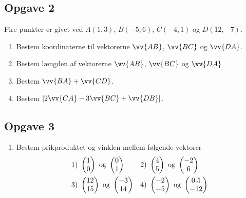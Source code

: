 \subsection*{Opgave 2}

Fire punkter er givet ved $A(1,3)$, $B(-5,6)$, $C(-4,1)$ og $D(12,-7)$.
\begin{enumerate}[label = \roman*)]
	\item Bestem koordinaterne til vektorerne $\vv{AB}$, $\vv{BC}$ og $\vv{DA}$.
	\item Bestem længden af vektorerne $\vv{AB}$, $\vv{BC}$ og $\vv{DA}$
	\item Bestem $\vv{BA} + \vv{CD}$.
	\item Bestem $|2\vv{CA} - 3\vv{BC} + \vv{DB}|$.
\end{enumerate}

\subsection*{Opgave 3}

\begin{enumerate}[label=\roman*)]
\item Bestem prikproduktet og vinklen mellem følgende vektorer
\begin{align*}
&1) \ \begin{pmatrix}1 \\ 0\end{pmatrix} \textnormal{ og } \begin{pmatrix}0 \\ 1\end{pmatrix}    &&2) \  \begin{pmatrix} 4 \\  5\end{pmatrix} \textnormal{ og } \begin{pmatrix} -2  \\ 6\end{pmatrix}    \\
&3) \ \begin{pmatrix}12 \\ 15\end{pmatrix} \textnormal{ og } \begin{pmatrix}-3 \\ 14 \end{pmatrix}   &&4) \ \begin{pmatrix} -2 \\ -5\end{pmatrix} \textnormal{ og } \begin{pmatrix} 0.5 \\ -12 \end{pmatrix}     \\
\end{align*}
\end{enumerate}

